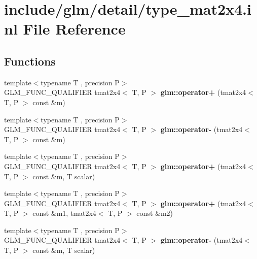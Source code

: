 \hypertarget{type__mat2x4_8inl}{}\section{include/glm/detail/type\+\_\+mat2x4.inl File Reference}
\label{type__mat2x4_8inl}
\subsection*{Functions}
\begin{DoxyCompactItemize}
\item 
\mbox{\label{type__mat2x4_8inl_a9ebbe55e926abef0e40cffbf794f64bc}} 
{\footnotesize template$<$typename T , precision P$>$ }\\G\+L\+M\+\_\+\+F\+U\+N\+C\+\_\+\+Q\+U\+A\+L\+I\+F\+I\+ER tmat2x4$<$ T, P $>$ {\bfseries glm\+::operator+} (tmat2x4$<$ T, P $>$ const \&m)
\item 
\mbox{\label{type__mat2x4_8inl_a213179e047320d6b697ff765b358471d}} 
{\footnotesize template$<$typename T , precision P$>$ }\\G\+L\+M\+\_\+\+F\+U\+N\+C\+\_\+\+Q\+U\+A\+L\+I\+F\+I\+ER tmat2x4$<$ T, P $>$ {\bfseries glm\+::operator-\/} (tmat2x4$<$ T, P $>$ const \&m)
\item 
\mbox{\label{type__mat2x4_8inl_a58df05b620ccc7a06ac8a1f6d96a695e}} 
{\footnotesize template$<$typename T , precision P$>$ }\\G\+L\+M\+\_\+\+F\+U\+N\+C\+\_\+\+Q\+U\+A\+L\+I\+F\+I\+ER tmat2x4$<$ T, P $>$ {\bfseries glm\+::operator+} (tmat2x4$<$ T, P $>$ const \&m, T scalar)
\item 
\mbox{\label{type__mat2x4_8inl_ad38e1685b1567e6b9085d474b7331b92}} 
{\footnotesize template$<$typename T , precision P$>$ }\\G\+L\+M\+\_\+\+F\+U\+N\+C\+\_\+\+Q\+U\+A\+L\+I\+F\+I\+ER tmat2x4$<$ T, P $>$ {\bfseries glm\+::operator+} (tmat2x4$<$ T, P $>$ const \&m1, tmat2x4$<$ T, P $>$ const \&m2)
\item 
\mbox{\label{type__mat2x4_8inl_a40136e4334d6cfccf0540552e7a21dc9}} 
{\footnotesize template$<$typename T , precision P$>$ }\\G\+L\+M\+\_\+\+F\+U\+N\+C\+\_\+\+Q\+U\+A\+L\+I\+F\+I\+ER tmat2x4$<$ T, P $>$ {\bfseries glm\+::operator-\/} (tmat2x4$<$ T, P $>$ const \&m, T scalar)

\end{DoxyCompactItemize}
